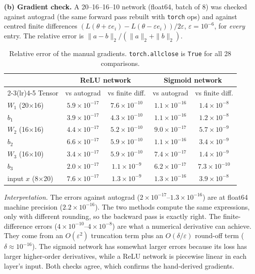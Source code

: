 \documentclass[10pt,a4paper]{article}
\begin{document}
\textbf{(b) Gradient check.} A 20--16--16--10 network (float64, batch of 8) was checked against autograd (the same forward pass rebuilt
with \texttt{torch} ops) and against centred finite differences $(L(\theta+\varepsilon e_i)-L(\theta-\varepsilon e_i))/2\varepsilon$,
$\varepsilon=10^{-6}$, for \emph{every} entry. The relative error is $\|a-b\|_2/(\|a\|_2+\|b\|_2)$.

\begin{table}[H]\centering\small
\caption{Relative error of the manual gradients. \texttt{torch.allclose} is \texttt{True} for all 28 comparisons.}
\begin{tabular}{lcccc}
\toprule
 & \multicolumn{2}{c}{ReLU network} & \multicolumn{2}{c}{Sigmoid network}\\
\cmidrule(lr){2-3}\cmidrule(lr){4-5}
Tensor & vs autograd & vs finite diff. & vs autograd & vs finite diff.\\
\midrule
$W_1$ (20$\times$16) & $5.9\times10^{-17}$ & $7.6\times10^{-10}$ & $1.1\times10^{-16}$ & $1.4\times10^{-8}$\\
$b_1$ & $3.9\times10^{-17}$ & $4.3\times10^{-10}$ & $1.1\times10^{-16}$ & $1.2\times10^{-8}$\\
$W_2$ (16$\times$16) & $4.4\times10^{-17}$ & $5.2\times10^{-10}$ & $9.0\times10^{-17}$ & $5.7\times10^{-9}$\\
$b_2$ & $6.6\times10^{-17}$ & $5.9\times10^{-10}$ & $1.1\times10^{-16}$ & $3.4\times10^{-9}$\\
$W_3$ (16$\times$10) & $3.4\times10^{-17}$ & $5.9\times10^{-10}$ & $7.4\times10^{-17}$ & $1.4\times10^{-9}$\\
$b_3$ & $2.0\times10^{-17}$ & $1.1\times10^{-9}$ & $6.2\times10^{-17}$ & $7.3\times10^{-10}$\\
input $x$ (8$\times$20) & $7.6\times10^{-17}$ & $1.3\times10^{-9}$ & $1.3\times10^{-16}$ & $3.9\times10^{-8}$\\
\bottomrule
\end{tabular}
\end{table}
\textit{Interpretation.} The errors against autograd ($2\times10^{-17}$--$1.3\times10^{-16}$) are at float64 machine precision
($2.2\times10^{-16}$). The two methods compute the same expressions, only with different rounding, so the backward pass is exactly right.
The finite-difference errors ($4\times10^{-10}$--$4\times10^{-8}$) are what a numerical derivative can achieve. They come from an
$O(\varepsilon^2)$ truncation term plus an $O(\delta/\varepsilon)$ round-off term ($\delta\approx10^{-16}$). The sigmoid network has
somewhat larger errors because its loss has larger higher-order derivatives, while a ReLU network is piecewise linear in each layer's
input. Both checks agree, which confirms the hand-derived gradients.
\end{document}
